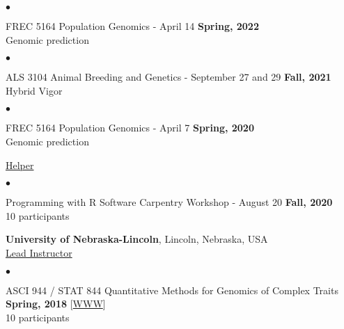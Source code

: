 \documentclass[margin,line,10pt]{res}
\newenvironment{list2}{
  \begin{list}{$\bullet$}{%
      \setlength{\itemsep}{0in}
      \setlength{\parsep}{0in} \setlength{\parskip}{0in}
      \setlength{\topsep}{0in} \setlength{\partopsep}{0in} 
      \setlength{\leftmargin}{0.2in}}}{\end{list}}
\begin{document}
\begin{resume}
\vspace{0.4cm}
 \begin{list2}
 \item FREC 5164 Population Genomics - April 14  \hfill {\bf Spring, 2022} \\
   Genomic prediction
\end{list2}


\vspace{0.4cm}
 \begin{list2}
 \item ALS 3104 Animal Breeding and Genetics  - September 27 and 29  \hfill {\bf Fall, 2021} \\
   Hybrid Vigor 
\end{list2}

  \vspace{0.3cm}

 
\vspace{0.4cm}
 \begin{list2}
 \item FREC 5164 Population Genomics - April 7  \hfill {\bf Spring, 2020} \\
   Genomic prediction
\end{list2}


 \vspace{0.3cm}


\underline{Helper}
 \vspace{0.4cm}
 \begin{list2}
 \item Programming with R Software Carpentry Workshop - August 20  \hfill {\bf Fall, 2020} \\
   10  participants 
\end{list2}

 
      \vspace{1cm}


{\bf University of Nebraska-Lincoln}, Lincoln, Nebraska, USA  \vspace{0.2cm} \\
\underline{Lead Instructor}
\vspace{0.4cm}
\begin{list2}

\item ASCI 944 / STAT 844 Quantitative Methods for Genomics of Complex Traits
  \hfill {\bf Spring, 2018} 
         [\textcolor{blue}{\href{http://morotalab.org/asci944-2018/ASCI944.html}{WWW}}] \\
         10  participants %

   \vspace{0.5cm}


\end{list2}
\end{resume}
\end{document}

